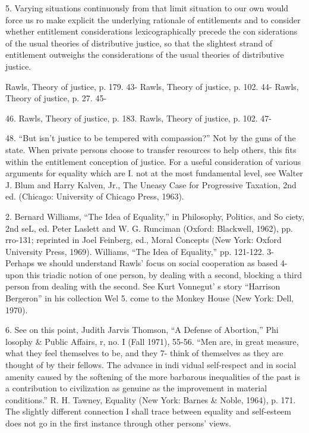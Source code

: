 \documentclass[11pt,openany]{book}
\begin{document}
{5. Varying situations continuously from that limit situation to our own would force us ro make explicit the underlying rationale of entitlements and to consider whether entitlement considerations lexicographically precede the con siderations of the usual theories of distributive justice, so that the slightest strand of entitlement outweighs the considerations of the usual theories of distributive justice.\par

Rawls, Theory of justice, p. 179. 43- Rawls, Theory of justice, p. 102. 44- Rawls, Theory of justice, p. 27. 45-\par

46. Rawls, Theory of justice, p. 183. Rawls, Theory of justice, p. 102. 47-\par

48. ``But isn't justice to be tempered with compassion?'' Not by the guns of the state. When private persons choose to transfer resources to help others, this fits within the entitlement conception of justice. For a useful consideration of various arguments for equality which are I. not at the most fundamental level, see Walter J. Blum and Harry Kalven, Jr., The Uneasy Case for Progressive Taxation, 2nd ed. (Chicago: University of Chicago Press, 1963).\par

2. Bernard Williams, ``The Idea of Equality,'' in Philosophy, Politics, and So ciety, 2nd seL, ed. Peter Laslett and W. G. Runciman (Oxford: Blackwell, 1962), pp. rro-131; reprinted in Joel Feinberg, ed., Moral Concepts (New York: Oxford University Press, 1969). Williams, ``The Idea of Equality,'' pp. 121-122. 3- Perhaps we should understand Rawls' focus on social cooperation as based 4- upon this triadic notion of one person, by dealing with a second, blocking a third person from dealing with the second. See Kurt Vonnegut' s story ``Harrison Bergeron'' in his collection Wel 5. come to the Monkey House (New York: Dell, 1970).\par

6. See on this point, Judith Jarvis Thomson, ``A Defense of Abortion,'' Phi losophy \& Public Affairs, r, no. I (Fall 1971), 55-56. ``Men are, in great measure, what they feel themselves to be, and they 7- think of themselves as they are thought of by their fellows. The advance in indi vidual self-respect and in social amenity caused by the softening of the more barbarous inequalities of the past is a contribution to civilization as genuine as the improvement in material conditions.'' R. H. Tawney, Equality (New York: Barnes \& Noble, 1964), p. 171. The slightly different connection I shall trace between equality and self-esteem does not go in the first instance through other persons' views.\par

}
\end{document}
